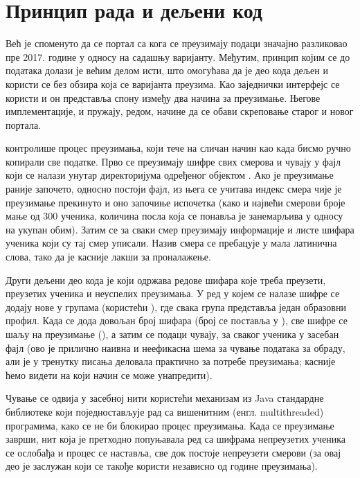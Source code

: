\section{Принцип рада и дељени код}

Већ је споменуто да се портал са кога се преузимају подаци значајно разликовао пре 2017. године у односу на садашњу варијанту. Међутим, принцип којим се до података долази је већим делом исти, што омогућава да је део кода дељен и користи се без обзира која се варијанта преузима. Као заједнички интерфејс се користи  и он представља спону између два начина за преузимање. Његове имплементације,  и  пружају, редом, начине да се обави скреповање старог и новог портала.

 контролише процес преузимања, који тече на сличан начин као када бисмо ручно копирали све податке. Прво се преузимају шифре свих смерова и чувају у фајл  који се налази унутар директоријума одређеног  објектом . Ако је преузимање раније започето, односно постоји  фајл, из њега се учитава индекс смера чије је преузимање прекинуто и оно започиње испочетка (како и највећи смерови броје мање од 300 ученика, количина посла која се понавља је занемарљива у односу на укупан обим). Затим се за сваки смер преузимају информације и листе шифара ученика који су тај смер уписали. Назив смера се пребацује у мала латинична слова, тако да је касније лакши за проналажење. 

Други дељени део кода је  који одржава редове шифара које треба преузети, преузетих ученика и неуспелих преузимања. У ред у којем се налазе шифре се додају нове у групама (користећи ), где свака група представља један образовни профил. Када се дода довољан број шифара (број се поставља у ), све шифре се шаљу на преузимање (), а затим се подаци чувају, за сваког ученика у засебан фајл (ово је прилично наивна и неефикасна шема за чување података за обраду, али је у тренутку писања деловала практично за потребе преузимања; касније ћемо видети на који начин се може унапредити). 

Чување се одвија у засебној нити користећи  механизам из Java стандардне библиотеке који поједностављује рад са вишенитним (енгл. multithreaded) програмима, како се не би блокирао процес преузимања. Када се преузимање заврши, нит која је претходно попуњавала ред са шифрама непреузетих ученика се ослобађа и процес се наставља, све док постоје непреузети смерови (за овај део је заслужан  који се такође користи независно од године преузимања).



